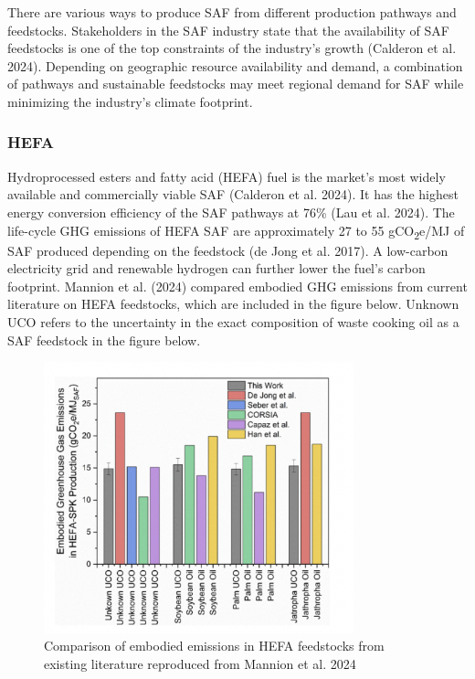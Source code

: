 \documentclass[12pt]{article}
\begin{document}
There are various ways to produce SAF from different production pathways and feedstocks. Stakeholders in the SAF industry state that the availability of SAF feedstocks is one of the top constraints of the industry’s growth (Calderon et al. 2024). Depending on geographic resource availability and demand, a combination of pathways and sustainable feedstocks may meet regional demand for SAF while minimizing the industry’s climate footprint.


\subsubsection{HEFA}

Hydroprocessed esters and fatty acid (HEFA) fuel is the market's most widely available and commercially viable SAF (Calderon et al. 2024). It has the highest energy conversion efficiency of the SAF pathways at 76\% (Lau et al. 2024). The life-cycle GHG emissions of HEFA SAF are approximately 27 to 55 gCO\textsubscript{2}e/MJ of SAF produced depending on the feedstock (de Jong et al. 2017). A low-carbon electricity grid and renewable hydrogen can further lower the fuel's carbon footprint. Mannion et al. (2024) compared embodied GHG emissions from current literature on HEFA feedstocks, which are included in the figure below. Unknown UCO refers to the uncertainty in the exact composition of waste cooking oil as a SAF feedstock in the figure below.

\begin{figure}[H]
\centering
\includegraphics[width=0.8\textwidth]{Figures/Fig 3.png} %
\caption{Comparison of embodied emissions in HEFA feedstocks from existing literature reproduced from Mannion et al. 2024}
\label{figure 3}
\end{figure}
\end{document}
